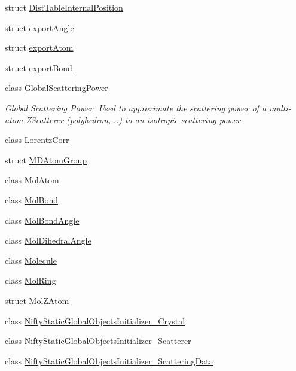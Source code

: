 \begin{DoxyCompactItemize}
struct \mbox{\hyperlink{struct_obj_cryst_1_1_dist_table_internal_position}{Dist\+Table\+Internal\+Position}}
\item 
struct \mbox{\hyperlink{struct_obj_cryst_1_1export_angle}{export\+Angle}}
\item 
struct \mbox{\hyperlink{struct_obj_cryst_1_1export_atom}{export\+Atom}}
\item 
struct \mbox{\hyperlink{struct_obj_cryst_1_1export_bond}{export\+Bond}}
\item 
class \mbox{\hyperlink{class_obj_cryst_1_1_global_scattering_power}{Global\+Scattering\+Power}}
\begin{DoxyCompactList}\small\item\em Global Scattering Power. Used to approximate the scattering power of a multi-\/atom \mbox{\hyperlink{class_obj_cryst_1_1_z_scatterer}{Z\+Scatterer}} (polyhedron,...) to an isotropic scattering power. \end{DoxyCompactList}\item 
class \mbox{\hyperlink{class_obj_cryst_1_1_lorentz_corr}{Lorentz\+Corr}}
\item 
struct \mbox{\hyperlink{struct_obj_cryst_1_1_m_d_atom_group}{M\+D\+Atom\+Group}}
\item 
class \mbox{\hyperlink{class_obj_cryst_1_1_mol_atom}{Mol\+Atom}}
\item 
class \mbox{\hyperlink{class_obj_cryst_1_1_mol_bond}{Mol\+Bond}}
\item 
class \mbox{\hyperlink{class_obj_cryst_1_1_mol_bond_angle}{Mol\+Bond\+Angle}}
\item 
class \mbox{\hyperlink{class_obj_cryst_1_1_mol_dihedral_angle}{Mol\+Dihedral\+Angle}}
\item 
class \mbox{\hyperlink{class_obj_cryst_1_1_molecule}{Molecule}}
\item 
class \mbox{\hyperlink{class_obj_cryst_1_1_mol_ring}{Mol\+Ring}}
\item 
struct \mbox{\hyperlink{struct_obj_cryst_1_1_mol_z_atom}{Mol\+Z\+Atom}}
\item 
class \mbox{\hyperlink{class_obj_cryst_1_1_nifty_static_global_objects_initializer___crystal}{Nifty\+Static\+Global\+Objects\+Initializer\+\_\+\+Crystal}}
\item 
class \mbox{\hyperlink{class_obj_cryst_1_1_nifty_static_global_objects_initializer___scatterer}{Nifty\+Static\+Global\+Objects\+Initializer\+\_\+\+Scatterer}}
\item 
class \mbox{\hyperlink{class_obj_cryst_1_1_nifty_static_global_objects_initializer___scattering_data}{Nifty\+Static\+Global\+Objects\+Initializer\+\_\+\+Scattering\+Data}}

\end{DoxyCompactItemize}
